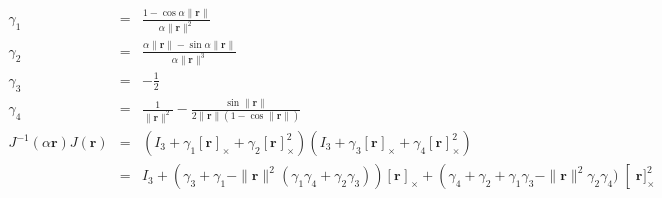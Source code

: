 \documentclass {article}
\newcommand\rot{\mathbf{r}}
\newcommand\rcross[1]{[\rot_{#1}]_{\times}}
\newcommand\normr{\|\rot\|}
\begin{document}
\begin{eqnarray*}
\gamma_1 &=& \frac{1 - \cos \alpha\normr}{\alpha\normr^2} \\
\gamma_2 &=& \frac{\alpha\normr -\sin\alpha\normr}{\alpha\normr^3} \\
\gamma_3 &=& -\frac{1}{2} \\
\gamma_4 &=& \frac{1}{\normr^2} - \frac{\sin\normr}{2\normr(1-\cos\normr)}\\
J^{-1}(\alpha\rot) J(\rot) &=& \left(I_3  + \gamma_1\rcross{} + \gamma_2\rcross{}^2\right)\left(I_3 + \gamma_3 \rcross{} +  \gamma_4 \rcross{}^2\right)\\
&=& I_3 + \left(\gamma_3 + \gamma_1 - \normr^2(\gamma_1\gamma_4+\gamma_2\gamma_3)\right)\rcross{} + \left(\gamma_4 + \gamma_2 + \gamma_1\gamma_3 - \normr^2\gamma_2\gamma_4)\right\rcross{}^2\\
\end{eqnarray*}
\end{document}
